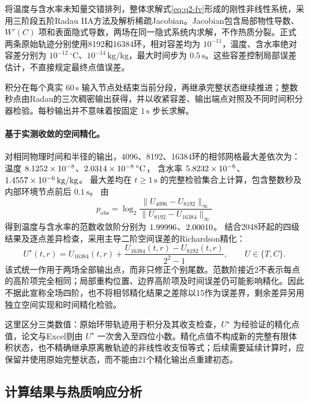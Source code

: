 将温度与含水率未知量交错排列，整体求解式\eqref{eq:q2-fv}形成的刚性非线性系统，采用三阶段五阶Radau IIA方法及解析稀疏Jacobian\cite{q1-radau}。Jacobian包含局部物性导数、\(W'(C)\) 项和表面隐式导数，两场在同一隐式系统内求解，不作热质分裂。正式两条原始轨迹分别使用8192和16384环，相对容差均为 \(10^{-11}\)，温度、含水率绝对容差分别为 \(10^{-12}\,^{\circ}\mathrm C\)、\(10^{-14}\,\mathrm{kg/kg}\)，最大时间步为 \(0.5\,\mathrm s\)。这些容差控制局部误差估计，不直接规定最终点值误差。

积分在每个真实 \(60\,\mathrm s\) 输入节点处结束当前分段，再继承完整状态继续推进；整数秒点由Radau的三次稠密输出获得，并以收紧容差、输出端点对照及不同时间积分器检验。每秒输出并不意味着按固定 \(1\,\mathrm s\) 步长求解。

\paragraph{基于实测收敛的空间精化。}
对相同物理时间和半径的输出，4096、8192、16384环的相邻网格最大差依次为：
温度 \(8.1252\times10^{-8}\)、\(2.0314\times10^{-8}\,^{\circ}\mathrm C\)，
含水率 \(5.8232\times10^{-6}\)、\(1.4557\times10^{-6}\,\mathrm{kg/kg}\)。
最大差均在 \(t\geq1\,\mathrm s\) 的完整检验集合上计算，包含整数秒及内部环境节点前后 \(0.1\,\mathrm s\)。
由
\begin{equation}
p_{\mathrm{obs}}
=\log_2\frac{\|U_{4096}-U_{8192}\|_\infty}
                  {\|U_{8192}-U_{16384}\|_\infty}
\label{eq:q2-observed-order}
\end{equation}
得到温度与含水率的范数收敛阶分别为 \(1.99996\)、\(2.00010\)。
结合2048环起的四级结果及逐点差异检查，采用主导二阶空间误差的Richardson精化\cite{q2-spatial-convergence}：
\begin{equation}
U^\star(t,r)=U_{16384}(t,r)
  +\frac{U_{16384}(t,r)-U_{8192}(t,r)}{2^2-1},
\qquad U\in\{T,C\}.
\label{eq:q2-richardson}
\end{equation}
该式统一作用于两场全部输出点，而非只修正个别尾数。范数阶接近2不表示每点的高阶项完全相同；局部重构位置、边界高阶项及时间误差仍可能影响精化。因此不据此宣称全场四阶，也不将相邻精化结果之差除以15作为误差界，剩余差异另用独立空间实现和时间精化检验。

这里区分三类数值：原始环带轨迹用于积分及其收支检查，\(U^\star\) 为经验证的精化点值，论文与Excel则由 \(U^\star\) 一次舍入至四位小数。精化点值不构成新的完整有限体积状态，也不精确继承原离散轨迹的非线性收支恒等式；后续需要延续计算时，应保留并使用原始完整状态，而不能由21个精化输出点重建初态。

\subsection{计算结果与热质响应分析}

